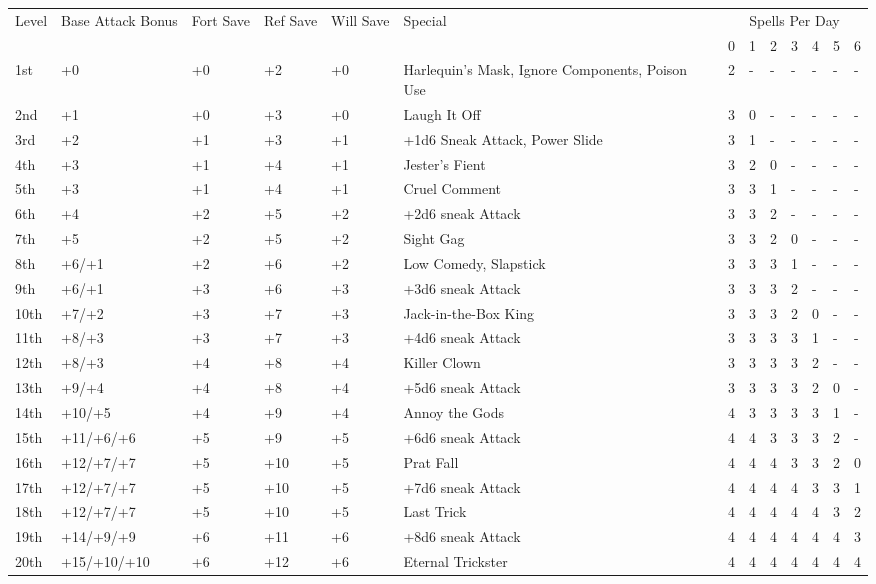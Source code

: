 \begin{table}[tbh]
\begin{small}
\begin{tabular}{lp{2cm}p{0.7cm}p{0.7cm}p{0.7cm}p{5cm}lllllll}
Level  &Base Attack Bonus &Fort Save &Ref Save &Will Save &Special &\multicolumn{7}{c}{Spells Per Day}\\
&&&&&&0 &1 &2 &3 &4 &5 &6\\
1st &+0 &+0 &+2 &+0 &Harlequin's Mask, Ignore Components, Poison Use &2 &- &- &- &- &- &-\\
2nd &+1 &+0 &+3 &+0 &Laugh It Off &3 &0 &- &- &- &- &-\\
3rd &+2 &+1 &+3 &+1 &+1d6 Sneak Attack, Power Slide &3 &1 &- &- &- &- &-\\
4th &+3 &+1 &+4 &+1 &Jester's Fient &3 &2 &0 &- &- &- &-\\
5th &+3 &+1 &+4 &+1 &Cruel Comment &3 &3 &1 &- &- &- &-\\
6th &+4 &+2 &+5 &+2 &+2d6 sneak Attack &3 &3 &2 &- &- &- &-\\
7th &+5 &+2 &+5 &+2 &Sight Gag &3 &3 &2 &0 &- &- &-\\
8th &+6/+1 &+2 &+6 &+2 &Low Comedy, Slapstick &3 &3 &3 &1 &- &- &-\\
9th &+6/+1 &+3 &+6 &+3 &+3d6 sneak Attack &3 &3 &3 &2 &- &- &-\\
10th &+7/+2 &+3 &+7 &+3 &Jack-in-the-Box King &3 &3 &3 &2 &0 &- &-\\
11th &+8/+3 &+3 &+7 &+3 &+4d6 sneak Attack &3 &3 &3 &3 &1 &- &-\\
12th &+8/+3 &+4 &+8 &+4 &Killer Clown &3 &3 &3 &3 &2 &- &-\\
13th &+9/+4 &+4 &+8 &+4 &+5d6 sneak Attack &3 &3 &3 &3 &2 &0 &-\\
14th &+10/+5 &+4 &+9 &+4 &Annoy the Gods &4 &3 &3 &3 &3 &1 &-\\
15th &+11/+6/+6 &+5 &+9 &+5 &+6d6 sneak Attack &4 &4 &3 &3 &3 &2 &-\\
16th &+12/+7/+7 &+5 &+10 &+5 &Prat Fall &4 &4 &4 &3 &3 &2 &0\\
17th &+12/+7/+7 &+5 &+10 &+5 &+7d6 sneak Attack &4 &4 &4 &4 &3 &3 &1\\
18th &+12/+7/+7 &+5 &+10 &+5 &Last Trick &4 &4 &4 &4 &4 &3 &2\\
19th &+14/+9/+9 &+6 &+11 &+6 &+8d6 sneak Attack &4 &4 &4 &4 &4 &4 &3\\
20th &+15/+10/+10 &+6 &+12 &+6 &Eternal Trickster &4 &4 &4 &4 &4 &4 &4\\

\end{tabular}
\end{small}
\end{table}

